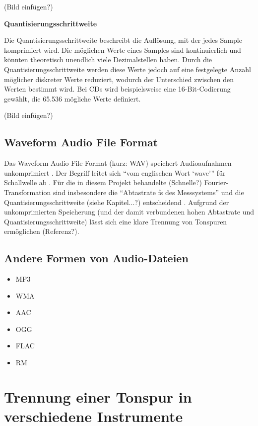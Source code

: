 %
(Bild einfügen?)
%

%
\textbf{Quantisierungsschrittweite}
%

Die Quantisierungsschrittweite beschreibt die Auflösung, mit der jedes Sample komprimiert wird. Die möglichen Werte eines Samples sind kontinuierlich und könnten theoretisch unendlich viele Dezimalstellen haben. Durch die Quantisierungsschrittweite werden diese Werte jedoch auf eine festgelegte Anzahl möglicher diskreter Werte reduziert, wodurch der Unterschied zwischen den Werten bestimmt wird. Bei CDs wird beispielsweise eine 16-Bit-Codierung gewählt, die 65.536 mögliche Werte definiert.

%
(Bild einfügen?)
%

%
\subsection{Waveform Audio File Format}
%

Das Waveform Audio File Format (kurz: WAV) speichert Audioaufnahmen unkomprimiert \parencite{what_is_a_wav_file}. Der Begriff leitet sich \enquote{vom englischen Wort \enquote{wave}} für Schallwelle ab \parencite{wav}. Für die in diesem Projekt behandelte (Schnelle?) Fourier-Transformation sind insbesondere die \enquote{Abtastrate fs des Messsystems} und die Quantisierungsschrittweite (siehe Kapitel...?) entscheidend  \parencite{FFT_grundlagen}. Aufgrund der unkomprimierten Speicherung (und der damit verbundenen hohen Abtastrate und Quantisierungsschrittweite) lässt sich eine klare Trennung von Tonspuren ermöglichen (Referenz?).


%
\subsection{Andere Formen von Audio-Dateien}
\label{audio_representations}
%

%
\begin{itemize}
    \item MP3
    \item WMA
    \item AAC
    \item OGG
    \item FLAC
    \item RM
\end{itemize}
%

\parencite{audioformate_im_überblick}

%
\section{Trennung einer Tonspur in verschiedene Instrumente}
%

